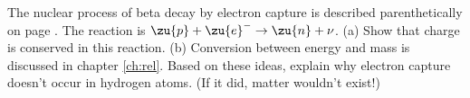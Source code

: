 The nuclear process of beta decay by electron capture
        is described parenthetically on page \pageref{electroncapture}. The reaction is
        $\zu{p}+\zu{e}^- \rightarrow \zu{n}+\nu$.\hwendpart
        (a) Show that charge is conserved in this
        reaction. \hwendpart
        (b) Conversion between energy and mass is
        discussed in chapter \ref{ch:rel}. Based on
        these ideas, explain why electron capture doesn't occur in
        hydrogen atoms. (If it did, matter wouldn't exist!)
